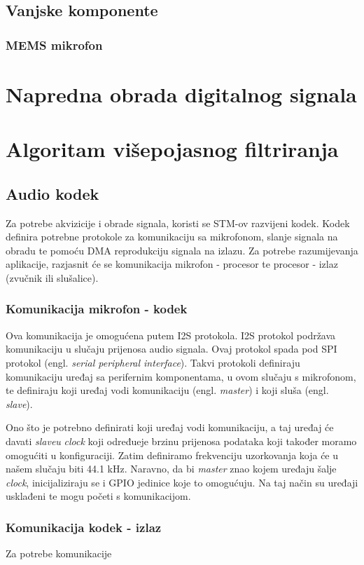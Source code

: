 \documentclass[times, utf8, diplomski]{fer}
\begin{document}
\section{Vanjske komponente}
\subsection{MEMS mikrofon}

\chapter{Napredna obrada digitalnog signala}
\chapter{Algoritam višepojasnog filtriranja}
\section{Audio kodek}
Za potrebe akvizicije i obrade signala, koristi se STM-ov razvijeni kodek. Kodek definira potrebne protokole za komunikaciju sa mikrofonom, slanje signala na obradu te pomoću DMA reprodukciju signala na izlazu. Za potrebe razumijevanja aplikacije, razjasnit će se komunikacija mikrofon - procesor te procesor - izlaz (zvučnik ili slušalice).

\subsection{Komunikacija mikrofon - kodek}
Ova komunikacija je omogućena putem I2S protokola. I2S protokol podržava komunikaciju u slučaju prijenosa audio signala. Ovaj protokol spada pod SPI protokol (engl. \textit{serial peripheral interface}). Takvi protokoli definiraju komunikaciju uređaj sa perifernim komponentama, u ovom slučaju s mikrofonom, te definiraju koji uređaj vodi komunikaciju (engl. \textit{master}) i koji sluša (engl. \textit{slave}).

Ono što je potrebno definirati koji uređaj vodi komunikaciju, a taj uređaj će davati \textit{slaveu} \textit{clock} koji određueje brzinu prijenosa podataka koji također moramo omogućiti u konfiguraciji. Zatim definiramo frekvenciju uzorkovanja koja će u našem slučaju biti 44.1 kHz. Naravno, da bi \textit{master} znao kojem uređaju šalje \textit{clock}, inicijaliziraju se i GPIO jedinice koje to omogućuju. Na taj način su uređaji usklađeni te mogu početi s komunikacijom.  

\subsection{Komunikacija kodek - izlaz}
Za potrebe komunikacije 
\end{document}
